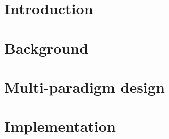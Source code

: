 \documentclass{article}
\begin{document}

\clearpage

\tableofcontents
\clearpage

\section{Introduction}
\label{sec:intro}


\section{Background}



\section{Multi-paradigm design}





\section{Implementation}






\end{document}

